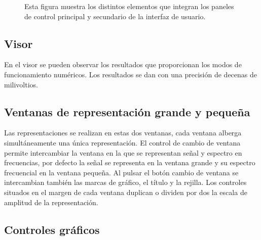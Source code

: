 \begin{figure}
    \begin{center}
    \end{center}
    \caption[Paneles de control de la interfaz de usuario]{Esta figura
    muestra los distintos elementos que integran los paneles de control
    principal y secundario de la interfaz de usuario.}
    \label{fig:controlpanels}
\end{figure}

\subsection{Visor}

En el visor se pueden observar los resultados que proporcionan los modos de
funcionamiento numéricos. Los resultados se dan con una precisión de
decenas de milivoltios.


\subsection{Ventanas de representación grande y
pequeña}\label{subsec:windows}

Las representaciones se realizan en estas dos ventanas, cada ventana
alberga simultáneamente una única representación. El control de cambio de
ventana permite intercambiar la ventana en la que se representan señal y
espectro en frecuencias, por defecto la señal se representa en la ventana
grande y su espectro frecuencial en la ventana pequeña. Al pulsar el botón
cambio de ventana se intercambian también las marcas de gráfico, el título
y la rejilla. Los controles situados en el margen de cada ventana duplican
o dividen por dos la escala de amplitud de la representación.

\subsection{Controles gráficos}\label{subsec:gfoptions}

